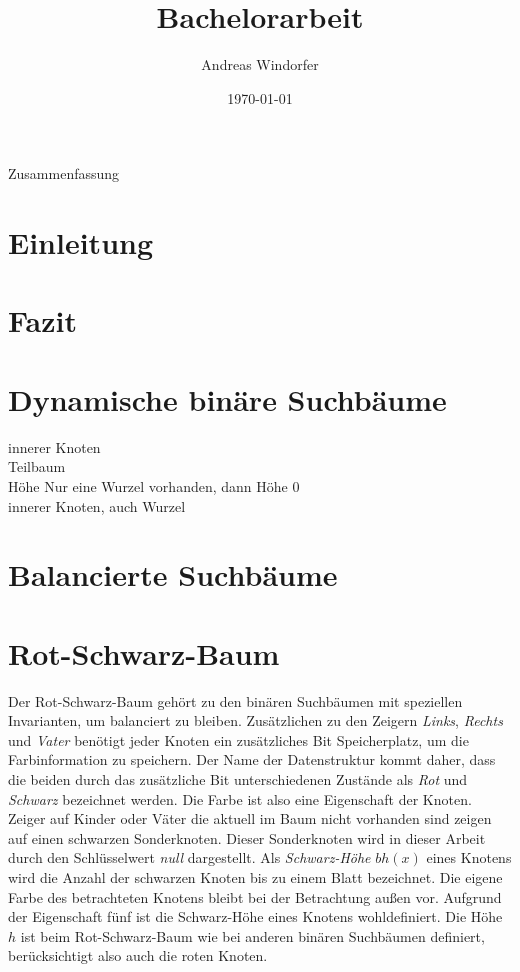 \documentclass[a4paper,12pt]{article}
\title{Bachelorarbeit}
\author{

	Andreas Windorfer\\
}
\date{\today}
\begin{document}
\maketitle
\newpage
Zusammenfassung
\newpage
\tableofcontents


\newpage

\section {Einleitung}
\section{Fazit}
\section{Dynamische binäre Suchbäume}
innerer Knoten\\
Teilbaum\\
Höhe Nur eine Wurzel vorhanden, dann Höhe 0\\
innerer Knoten, auch Wurzel\\
\section{Balancierte Suchbäume}
\section{Rot-Schwarz-Baum}
Der Rot-Schwarz-Baum gehört zu den binären Suchbäumen mit speziellen Invarianten, um balanciert zu bleiben. Zusätzlichen zu den Zeigern  \textit{Links}, \textit{Rechts} und \textit{Vater} benötigt jeder Knoten ein zusätzliches Bit Speicherplatz, um die Farbinformation zu speichern. Der Name der Datenstruktur kommt daher, dass die beiden durch das zusätzliche Bit unterschiedenen Zustände als \textit{Rot} und \textit{Schwarz} bezeichnet werden. Die Farbe ist also eine Eigenschaft der Knoten. Zeiger auf Kinder oder Väter die aktuell im Baum nicht vorhanden sind zeigen auf einen schwarzen Sonderknoten. Dieser Sonderknoten wird in dieser Arbeit durch den Schlüsselwert  \textit{null} dargestellt. Als \textit{Schwarz-Höhe} $\mathit{bh(x)}$ eines Knotens wird die Anzahl der schwarzen Knoten bis zu einem Blatt bezeichnet. Die eigene Farbe des betrachteten Knotens bleibt bei der Betrachtung außen vor. Aufgrund der Eigenschaft fünf ist die Schwarz-Höhe eines Knotens wohldefiniert. Die Höhe $h$ ist beim Rot-Schwarz-Baum wie bei anderen binären Suchbäumen definiert, berücksichtigt also auch die roten Knoten. 
\end{document}
